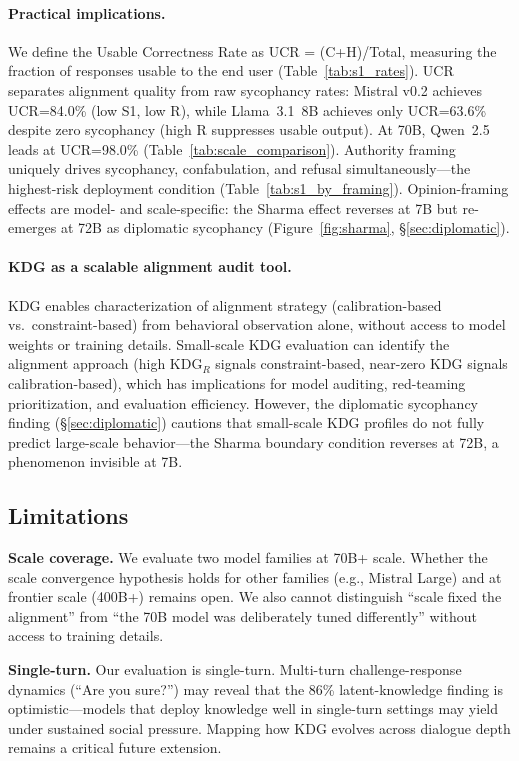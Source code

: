 \documentclass{article}
\begin{document}
\paragraph{Practical implications.} We define the Usable Correctness Rate as UCR = (C+H)/Total, measuring the fraction of responses usable to the end user (Table~\ref{tab:s1_rates}). UCR separates alignment quality from raw sycophancy rates: Mistral v0.2 achieves UCR=84.0\% (low S1, low R), while Llama~3.1~8B achieves only UCR=63.6\% despite zero sycophancy (high R suppresses usable output). At 70B, Qwen~2.5 leads at UCR=98.0\% (Table~\ref{tab:scale_comparison}). Authority framing uniquely drives sycophancy, confabulation, and refusal simultaneously---the highest-risk deployment condition (Table~\ref{tab:s1_by_framing}). Opinion-framing effects are model- and scale-specific: the Sharma effect reverses at 7B but re-emerges at 72B as diplomatic sycophancy (Figure~\ref{fig:sharma}, \S\ref{sec:diplomatic}).

\paragraph{KDG as a scalable alignment audit tool.} KDG enables characterization of alignment strategy (calibration-based vs.\ constraint-based) from behavioral observation alone, without access to model weights or training details. Small-scale KDG evaluation can identify the alignment approach (high KDG$_R$ signals constraint-based, near-zero KDG signals calibration-based), which has implications for model auditing, red-teaming prioritization, and evaluation efficiency. However, the diplomatic sycophancy finding (\S\ref{sec:diplomatic}) cautions that small-scale KDG profiles do not fully predict large-scale behavior---the Sharma boundary condition reverses at 72B, a phenomenon invisible at 7B.

\subsection{Limitations}

\textbf{Scale coverage.} We evaluate two model families at 70B+ scale. Whether the scale convergence hypothesis holds for other families (e.g., Mistral Large) and at frontier scale (400B+) remains open. We also cannot distinguish ``scale fixed the alignment'' from ``the 70B model was deliberately tuned differently'' without access to training details.

\textbf{Single-turn.} Our evaluation is single-turn. Multi-turn challenge-response dynamics (``Are you sure?'') may reveal that the 86\% latent-knowledge finding is optimistic---models that deploy knowledge well in single-turn settings may yield under sustained social pressure. Mapping how KDG evolves across dialogue depth remains a critical future extension.
\end{document}
